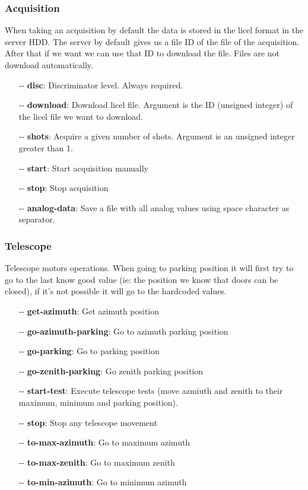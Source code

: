\documentclass[letterpaper, 10 pt]{article}
\begin{document}
\subsubsection{Acquisition}
When taking an acquisition by default the data is stored in the licel format in the server HDD. The server by default gives us a file ID of the file of the acquisition. After that if we want we can use that ID to download the file. Files are not download automatically.
\begin{itemize}
	\item[-{}-] \textbf{disc}: Discriminator level. Always required.
	\item[-{}-] \textbf{download}: Download licel file. Argument is the ID (unsigned integer) of the licel file we want to download.
	\item[-{}-] \textbf{shots}: Acquire a given number of shots. Argument is an unsigned integer greater than 1. 
	\item[-{}-] \textbf{start}: Start acquisition manually
	\item[-{}-] \textbf{stop}: Stop acquisition
	\item[-{}-] \textbf{analog-data}: Save a file with all analog values using space character as separator.
\end{itemize}
\subsubsection{Telescope}
Telescope motors operations. When going to parking position it will first try to go to the last know good value (ie: the position we know that doors can be closed), if it's not possible it will go to the hardcoded values.
\begin{itemize}
	\item[-{}-] \textbf{get-azimuth}: Get azimuth position
	\item[-{}-] \textbf{go-azimuth-parking}: Go to azimuth parking position
	\item[-{}-] \textbf{go-parking}: Go to parking position
	\item[-{}-] \textbf{go-zenith-parking}: Go zenith parking position
	\item[-{}-] \textbf{start-test}: Execute telescope tests (move azmiuth and zenith to their maximum, minimum and parking position).
	\item[-{}-] \textbf{stop}: Stop any telescope movement
	\item[-{}-] \textbf{to-max-azimuth}: Go to maximum azimuth
	\item[-{}-] \textbf{to-max-zenith}: Go to maximum zenith
	\item[-{}-] \textbf{to-min-azimuth}: Go to minimum azimuth		
\end{itemize}
\end{document}
